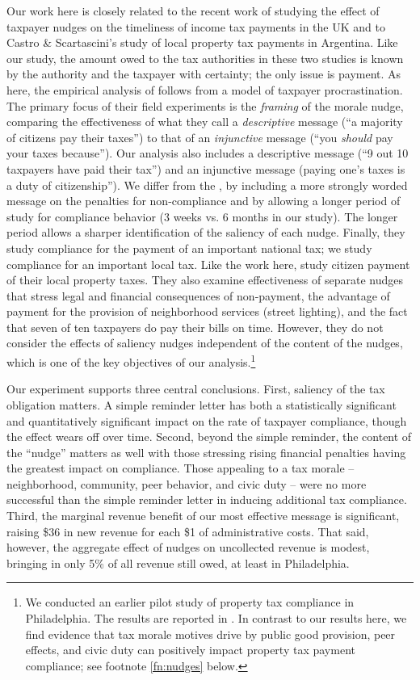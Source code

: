 Our work here is closely related to the recent work of
\cite{Hallsworth-14} studying the effect of taxpayer nudges on the
timeliness of income tax payments in the UK and to Castro \& Scartascini's \citeyearpar{castro} study
of local property tax payments in Argentina.  Like our study, the
amount owed to the tax authorities in these two studies is known by
the authority and the taxpayer with certainty; the only issue is
payment. As here, the empirical analysis of \cite{Hallsworth-14}
follows from a model of taxpayer procrastination.  The primary focus
of their field experiments is the \textit{framing} of the morale
nudge, comparing the effectiveness of what they call a
\textit{descriptive} message (``a majority of citizens pay their
taxes'') to that of an \textit{injunctive} message (``you
\textit{should} pay your taxes because'').  Our analysis also includes
a descriptive message (``9 out 10 taxpayers have paid their tax'') and
an injunctive message (paying one's taxes is a duty of citizenship'').
We differ from the \cite{Hallsworth-14}, by including a more strongly
worded message on the penalties for non-compliance and by allowing a
longer period of study for compliance behavior (3 weeks vs. 6 months
in our study).  The longer period allows a sharper identification of
the saliency of each nudge.  Finally, they study compliance for the
payment of an important national tax; we study compliance for an
important local tax.  Like the work
here, \cite{castro} study citizen payment of their local property
taxes. They also examine effectiveness of separate nudges that stress
legal and financial consequences of non-payment, the advantage of
payment for the provision of neighborhood services (street lighting),
and the fact that seven of ten taxpayers do pay their bills on
time. However, they do not consider the effects of saliency nudges
independent of the content of the nudges, which is one of the key
objectives of our analysis.\footnote{We conducted an earlier pilot study of
  property tax compliance in Philadelphia.  The results are reported
  in \citealt{CILMS-16}. In contrast to our results here, we find evidence that  tax morale motives drive by public good provision, peer effects, and civic duty can positively impact
  property tax payment compliance; see footnote \ref{fn:nudges} below.}

Our experiment supports three central conclusions. First, saliency of
the tax obligation matters. A simple reminder letter has both a
statistically significant and quantitatively significant impact on the
rate of taxpayer compliance, though the effect wears off over
time. Second, beyond the simple reminder, the content of the ``nudge''
matters as well with those stressing rising financial penalties having
the greatest impact on compliance. Those appealing to a tax morale --
neighborhood, community, peer behavior, and civic duty -- were no more
successful than the simple reminder letter in inducing additional tax
compliance. Third, the marginal revenue benefit of our most effective message is significant, raising \$36 in new revenue for each \$1 of administrative costs. That said, however, the aggregate effect of nudges on uncollected revenue is modest, bringing in only 5\% of all revenue still owed, at least in Philadelphia.
